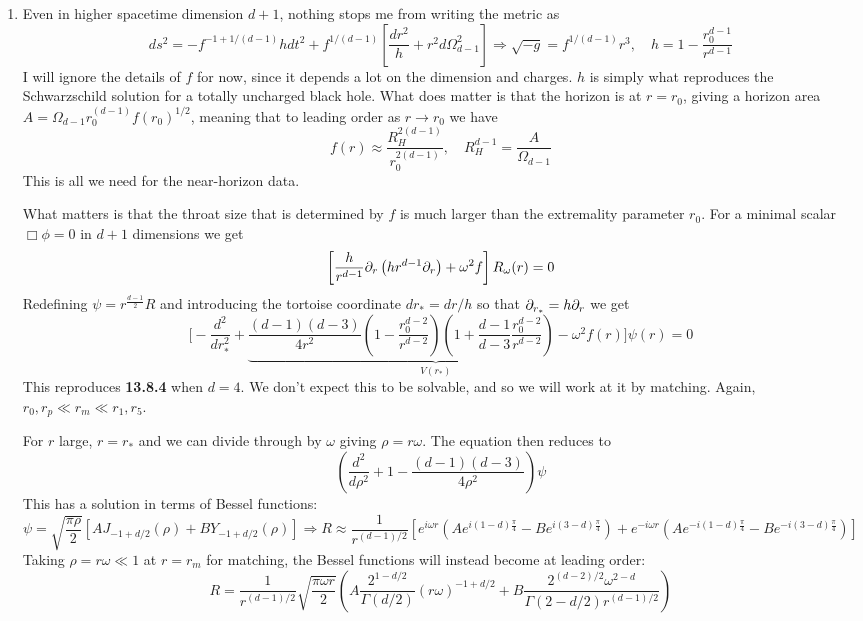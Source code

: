 \documentclass[11pt, class=article, crop=false]{standalone}
\begin{document}
\begin{enumerate}
	\item 
	Even in higher spacetime dimension $d+1$, nothing stops me from writing the metric as
	\[
		ds^2 = - f^{-1+1/(d-1)} h dt^2 + f^{1/(d-1)} \left[\frac{dr^2}{h} + r^2 d \Omega_{d-1}^2 \right] \Rightarrow \sqrt{-g} = f^{1/(d-1)} r^3, \quad h = 1 - \frac{r_0^{d-1}}{r^{d-1}}
	\]
	I will ignore the details of $f$ for now, since it depends a lot on the dimension and charges. $h$ is simply what reproduces the Schwarzschild solution for a totally uncharged black hole. What does matter is that the horizon is at $r = r_0$, giving a horizon area $A = \Omega_{d-1} r_0^{(d-1)} f(r_0)^{1/2}$, meaning that to leading order as $r \to r_0$ we have
	\[
		f(r) \approx \frac{R_H^{2(d-1)}}{r_0^{2(d-1)}}, \quad R_H^{d-1} = \frac{A}{\Omega_{d-1}}
	\]
	This is all we need for the near-horizon data.
	
	 What matters is that the throat size that is determined by $f$ is much larger than the extremality parameter $r_0$. For a minimal scalar $\Box \phi = 0$ in $d+1$ dimensions we get
	\[
		\left[\frac{h}{r^{d-1}} \partial_r \left(h r^{d-1} \partial_r \right) + \omega^2 f \right] R_\omega (r) = 0
	\]
	Redefining $\psi = r^{\frac{d-1}{2}} R$ and introducing the tortoise coordinate $dr_* = dr/h$ so that $\partial_{r_*} = h \partial_r$ we get
	\[
		\Big[- \frac{d^2}{dr_*^2} + \underbrace{\frac{(d-1)(d-3)}{4 r^2} \left(1 - \frac{r_0^{d-2}}{r^{d-2}} \right) \left(1+ \frac{d-1}{d-3} \frac{r_0^{d-2}}{r^{d-2}}\right) - \omega^2 f(r)}_{V(r_*)} \Big] \psi(r) = 0
	\]
	This reproduces \textbf{13.8.4} when $d=4$.
	We don't expect this to be solvable, and so we will work at it by matching. Again, $r_0, r_p \ll r_m \ll r_1, r_5$.

	For $r$ large, $r = r_*$ and we can divide through by $\omega$ giving $\rho = r \omega$. The equation then reduces to
	\[
		\left(\frac{d^2}{d\rho^2} + 1 - \frac{(d-1)(d-3)}{4 \rho^2} \right) \psi
	\]
	This has a solution in terms of Bessel functions:
	\[
		\psi = \sqrt{\frac{\pi \rho}{2}} [A J_{-1+d/2} (\rho) + B Y_{-1+d/2} (\rho)] \Rightarrow R \approx \frac{1}{r^{(d-1)/2}} [e^{i \omega r} (A e^{i (1 - d)  \frac \pi4} - B e^{i (3 - d)  \frac \pi4}) + e^{-i \omega r} (A e^{-i (1 - d)  \frac \pi4} - B e^{-i (3 - d)  \frac \pi4})]
	\]
	Taking $\rho = r \omega \ll 1$ at $r = r_m$ for matching, the Bessel functions will instead become at leading order:
	\[
		R = \frac{1}{r^{(d-1)/2}}\sqrt{\frac{\pi \omega r}{2}} \left(A \frac{2^{1-d/2}}{\Gamma(d/2)} (r\omega)^{-1+d/2} + B \frac{2^{(d-2)/2}\omega^{2-d}}{\Gamma(2-d/2) r^{(d-1)/2}} \right) %
	\]
	

\end{enumerate}
\end{document}
